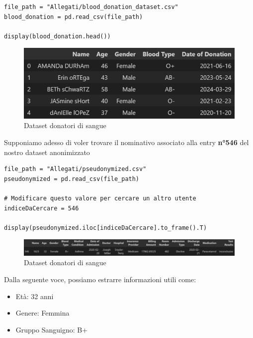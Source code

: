 \begin{lstlisting}[caption={Dataset Donatori di sangue}]
file_path = "Allegati/blood_donation_dataset.csv"
blood_donation = pd.read_csv(file_path)

display(blood_donation.head())
\end{lstlisting}

\begin{figure}[H]
    \centering
    \includegraphics[width=0.95\linewidth]{Images/Img4.png}
    \caption{Dataset donatori di sangue}
\end{figure}

\newpage
Supponiamo adesso di voler trovare il nominativo associato alla entry \textbf{n°546} del nostro dataset anonimizzato\\

\begin{lstlisting}[caption={Ricerca pseudonimo}]
file_path = "Allegati/pseudonymized.csv"
pseudonymized = pd.read_csv(file_path)

# Modificare questo valore per cercare un altro utente
indiceDaCercare = 546 

display(pseudonymized.iloc[indiceDaCercare].to_frame().T)
\end{lstlisting}

\begin{figure}[H]
    \centering
    \includegraphics[width=1.0\linewidth]{Images/Img5.png}
    \caption{Dataset donatori di sangue}
\end{figure}

Dalla seguente voce, possiamo estrarre informazioni utili come:

\begin{itemize}
    \item Età: 32 anni
    \item Genere: Femmina
    \item Gruppo Sanguigno: B+
\end{itemize}

